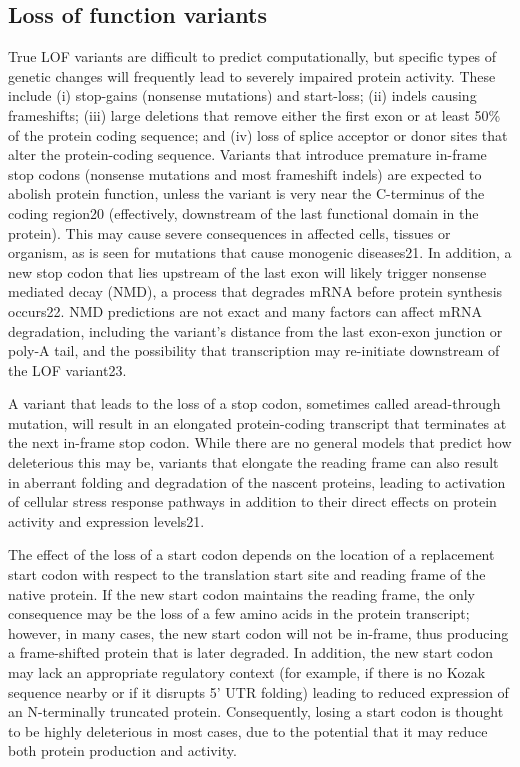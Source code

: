 \subsection{Loss of function variants}

True LOF variants are difficult to predict computationally, but specific types of genetic changes will frequently lead to severely impaired protein activity. These include (i) stop-gains (nonsense mutations) and start-loss; (ii) indels causing frameshifts; (iii) large deletions that remove either the first exon or at least 50\% of the protein coding sequence; and (iv) loss of splice acceptor or donor sites that alter the protein-coding sequence. Variants that introduce premature in-frame stop codons (nonsense mutations and most frameshift indels) are expected to abolish protein function, unless the variant is very near the C-terminus of the coding region20 (effectively, downstream of the last functional domain in the protein). This may cause severe consequences in affected cells, tissues or organism, as is seen for mutations that cause monogenic diseases21. In addition, a new stop codon that lies upstream of the last exon will likely trigger nonsense mediated decay (NMD), a process that degrades mRNA before protein synthesis occurs22. NMD predictions are not exact and many factors can affect mRNA degradation, including the variant’s distance from the last exon-exon junction or poly-A tail, and the possibility that transcription may re-initiate downstream of the LOF variant23.

A variant that leads to the loss of a stop codon, sometimes called aread-through mutation, will result in an elongated protein-coding transcript that terminates at the next in-frame stop codon. While there are no general models that predict how deleterious this may be, variants that elongate the reading frame can also result in aberrant folding and degradation of the nascent proteins, leading to activation of cellular stress response pathways in addition to their direct effects on protein activity and expression levels21.

The effect of the loss of a start codon depends on the location of a replacement start codon with respect to the translation start site and reading frame of the native protein. If the new start codon maintains the reading frame, the only consequence may be the loss of a few amino acids in the protein transcript; however, in many cases, the new start codon will not be in-frame, thus producing a frame-shifted protein that is later degraded. In addition, the new start codon may lack an appropriate regulatory context (for example, if there is no Kozak sequence nearby or if it disrupts 5’ UTR folding) leading to reduced expression of an N-terminally truncated protein. Consequently, losing a start codon is thought to be highly deleterious in most cases, due to the potential that it may reduce both protein production and activity.

